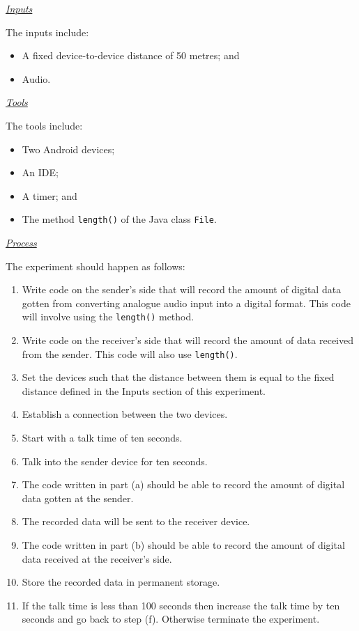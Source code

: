 \documentclass[12pt,svgnames,smaller]{article} %
\begin{document}
\begin{enumerate}
\begin{enumerate}
			\textsf{\underline{\emph{Inputs}}}

			The inputs include:

			\begin{itemize}
				\item A fixed device-to-device distance of 50 metres; and
				\item Audio.
			\end{itemize}
			
			\emph{\underline{\textsf{Tools}}}
			
			The tools include:
			
			\begin{itemize}
				\item Two Android devices; 
				\item An IDE;
				\item A timer; and
				\item The method \texttt{length()} of the Java class \texttt{File}. 
			\end{itemize}
			
			\emph{\underline{\textsf{Process}}}

			The experiment should happen as follows:
			
			\begin{enumerate}
				\item Write code on the sender’s side that will record the amount of digital data gotten from converting analogue audio input into a digital format. This code will involve using the \texttt{length()} method.
				\item Write code on the receiver’s side that will record the amount of data received from the sender. This code will also use \texttt{length()}.
				\item Set the devices such that the distance between them is equal to the fixed distance defined in the Inputs section of this experiment.
				\item Establish a connection between the two devices.
				\item Start with a talk time of ten seconds.
				\item Talk into the sender device for ten seconds. 
				\item The code written in part (a) should be able to record the amount of digital data gotten at the sender.
				\item The recorded data will be sent to the receiver device.
				\item The code written in part (b) should be able to record the amount of digital data received at the receiver’s side.
				\item Store the recorded data in permanent storage.
				\item If the talk time is less than 100 seconds then increase the talk time by ten seconds and go back to step (f). Otherwise terminate the experiment. 
				

\end{enumerate}
\end{enumerate}
\end{enumerate}
\end{document}
